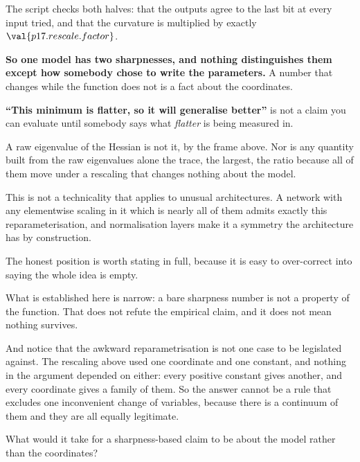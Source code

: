 \begin{fr}
The script checks both halves: that the outputs agree to the last bit at every
input tried, and that the curvature is multiplied by exactly
$\val{p17.rescale.factor}$.

\textbf{So one model has two sharpnesses, and nothing distinguishes them
except how somebody chose to write the parameters.} A number that changes
while the function does not is a fact about the coordinates.

\end{fr}

\begin{fr}
\begin{trapbox}
\textbf{\enquote{This minimum is flatter, so it will generalise better}} is
not a claim you can evaluate until somebody says what \emph{flatter} is being
measured in.

A raw eigenvalue of the Hessian is not it, by the frame above. Nor is any
quantity built from the raw eigenvalues alone \dash{} the trace, the largest,
the ratio \dash{} because all of them move under a rescaling that changes
nothing about the model.

This is not a technicality that applies to unusual architectures. A network
with any elementwise scaling in it \dash{} which is nearly all of them
\dash{} admits exactly this reparameterisation, and normalisation layers make
it a symmetry the architecture has by construction.
\end{trapbox}
\end{fr}

\begin{fr}
The honest position is worth stating in full, because it is easy to
over-correct into saying the whole idea is empty.

What is established here is narrow: a bare sharpness number is not a property
of the function. That does not refute the empirical claim, and it does not
mean nothing survives.

And notice that the awkward reparametrisation is not one case to be
legislated against. The rescaling above used one coordinate and one constant,
and nothing in the argument depended on either: every positive constant gives
another, and every coordinate gives a family of them. So the answer cannot be
a rule that excludes one inconvenient change of variables, because there is a
continuum of them and they are all equally legitimate.

What would it take for a sharpness-based claim to be about the model rather
than the coordinates?
\dotline
\nextframe
\end{fr}

